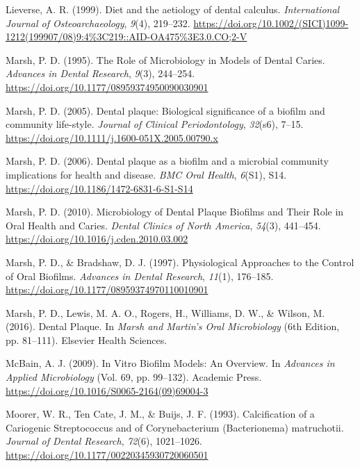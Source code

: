 \documentclass[
  b5paper,
]{book}
\newlength{\cslhangindent}
\newenvironment{CSLReferences}[2] %
 {\begin{list}{}{%
  \setlength{\itemindent}{0pt}
  \setlength{\leftmargin}{0pt}
  \setlength{\parsep}{0pt}
  \ifodd #1
   \setlength{\leftmargin}{\cslhangindent}
   \setlength{\itemindent}{-1\cslhangindent}
  \fi
  \setlength{\itemsep}{#2\baselineskip}}}
 {\end{list}}
\begin{document}
\begin{CSLReferences}{1}{0}
Lieverse, A. R. (1999). Diet and the aetiology of dental calculus.
\emph{International Journal of Osteoarchaeology}, \emph{9}(4), 219--232.
\url{https://doi.org/10.1002/(SICI)1099-1212(199907/08)9:4\%3C219::AID-OA475\%3E3.0.CO;2-V}

Marsh, P. D. (1995). The {Role} of {Microbiology} in {Models} of {Dental
Caries}. \emph{Advances in Dental Research}, \emph{9}(3), 244--254.
\url{https://doi.org/10.1177/08959374950090030901}

Marsh, P. D. (2005). Dental plaque: Biological significance of a biofilm
and community life-style. \emph{Journal of Clinical Periodontology},
\emph{32}(s6), 7--15.
\url{https://doi.org/10.1111/j.1600-051X.2005.00790.x}

Marsh, P. D. (2006). Dental plaque as a biofilm and a microbial
community \textendash{} implications for health and disease. \emph{BMC
Oral Health}, \emph{6}(S1), S14.
\url{https://doi.org/10.1186/1472-6831-6-S1-S14}

Marsh, P. D. (2010). Microbiology of {Dental Plaque Biofilms} and {Their
Role} in {Oral Health} and {Caries}. \emph{Dental Clinics of North
America}, \emph{54}(3), 441--454.
\url{https://doi.org/10.1016/j.cden.2010.03.002}

Marsh, P. D., \& Bradshaw, D. J. (1997). Physiological {Approaches} to
the {Control} of {Oral Biofilms}. \emph{Advances in Dental Research},
\emph{11}(1), 176--185.
\url{https://doi.org/10.1177/08959374970110010901}

Marsh, P. D., Lewis, M. A. O., Rogers, H., Williams, D. W., \& Wilson,
M. (2016). Dental {Plaque}. In \emph{Marsh and {Martin}'s {Oral
Microbiology}} (6th Edition, pp. 81--111). {Elsevier Health Sciences}.

McBain, A. J. (2009). In {Vitro Biofilm Models}: {An Overview}. In
\emph{Advances in {Applied Microbiology}} (Vol. 69, pp. 99--132).
{Academic Press}. \url{https://doi.org/10.1016/S0065-2164(09)69004-3}

Moorer, W. R., Ten Cate, J. M., \& Buijs, J. F. (1993). Calcification of
a {Cariogenic Streptococcus} and of {Corynebacterium} ({Bacterionema})
matruchotii. \emph{Journal of Dental Research}, \emph{72}(6),
1021--1026. \url{https://doi.org/10.1177/00220345930720060501}


\end{CSLReferences}
\end{document}
